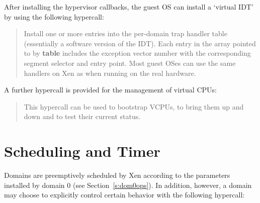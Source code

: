 \documentclass[11pt,twoside,final,openright]{report}
\newcommand{\hypercall}[1]{\vspace{2mm}{\sf #1}}
\begin{document}
\begin{quote}
\hypercall{set\_callbacks(unsigned long event\_address, unsigned long
  failsafe\_address, unsigned long syscall\_address)}
\end{quote} 


After installing the hypervisor callbacks, the guest OS can 
install a `virtual IDT' by using the following hypercall: 

\begin{quote} 
\hypercall{set\_trap\_table(trap\_info\_t *table)} 

Install one or more entries into the per-domain 
trap handler table (essentially a software version of the IDT). 
Each entry in the array pointed to by {\bf table} includes the 
exception vector number with the corresponding segment selector 
and entry point. Most guest OSes can use the same handlers on 
Xen as when running on the real hardware.


\end{quote} 

A further hypercall is provided for the management of virtual CPUs:

\begin{quote}
\hypercall{vcpu\_op(int cmd, int vcpuid, void *extra\_args)}

This hypercall can be used to bootstrap VCPUs, to bring them up and
down and to test their current status.

\end{quote}

\section{Scheduling and Timer}

Domains are preemptively scheduled by Xen according to the 
parameters installed by domain 0 (see Section~\ref{s:dom0ops}). 
In addition, however, a domain may choose to explicitly 
control certain behavior with the following hypercall: 
\end{document}
